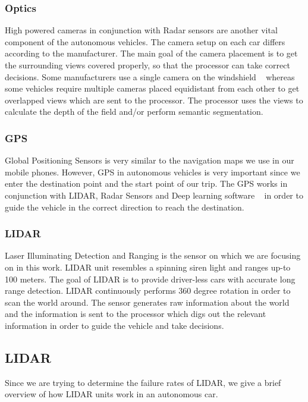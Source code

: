 \subsubsection{Optics}
High powered cameras in conjunction with Radar sensors are another vital component of the autonomous vehicles. The camera setup on each car differs according to the manufacturer. The main goal of the camera placement is to get the surrounding views covered properly, so that the processor can take correct decisions. Some manufacturers use a single camera on the windshield ~\cite{singlecamera} whereas some vehicles require multiple cameras placed equidistant from each other to get overlapped views which are sent to the processor. The processor uses the views to calculate the depth of the field and/or perform semantic segmentation.

\subsubsection{GPS}
Global Positioning Sensors is very similar to the navigation maps we use in our mobile phones. However, GPS in autonomous vehicles is very important since we enter the destination point and the start point of our trip. The GPS works in conjunction with LIDAR, Radar Sensors and Deep learning software ~\cite{GPS} in order to guide the vehicle in the correct direction to reach the destination.

\subsubsection{LIDAR}
Laser Illuminating Detection and Ranging is the sensor on which we are focusing on in this work. LIDAR unit resembles a spinning siren light and ranges up-to 100 meters. The goal of LIDAR is to provide driver-less cars with accurate long range detection. LIDAR continuously performs 360 degree rotation in order to scan the world around. The sensor generates raw information about the world and the information is sent to the processor which digs out the relevant information in order to guide the vehicle and take decisions.

\subsection{LIDAR}
Since we are trying to determine the failure rates of LIDAR, we give a brief overview of how LIDAR units work in an autonomous car.

